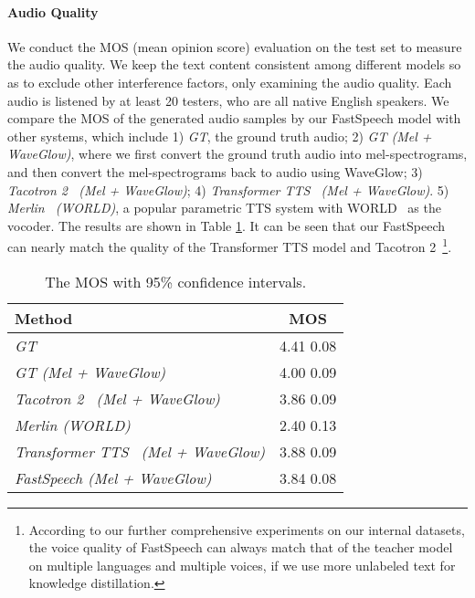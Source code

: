 \documentclass{article}
\begin{document}
\paragraph{Audio Quality}
We conduct the MOS (mean opinion score) evaluation on the test set to measure the audio quality. We keep the text content consistent among different models so as to exclude other interference factors, only examining the audio quality. Each audio is listened by at least 20 testers, who are all native English speakers. We compare the MOS of the generated audio samples by our FastSpeech model with other systems, which include 1) \textit{GT}, the ground truth audio; 2) \textit{GT (Mel + WaveGlow)}, where we first convert the ground truth audio into mel-spectrograms, and then convert the mel-spectrograms back to audio using WaveGlow; 3) \textit{Tacotron 2~\citep{shen2018natural} (Mel + WaveGlow)}; 4) \textit{Transformer TTS~\citep{li2018close} (Mel + WaveGlow)}. 5) \textit{Merlin~\citep{wu2016merlin} (WORLD)}, a popular parametric TTS system with WORLD~\citep{morise2016world} as the vocoder. The results are shown in Table \ref{tab_main_results}. It can be seen that our FastSpeech can nearly match the quality of the Transformer TTS model and Tacotron 2~\footnote{According to our further comprehensive experiments on our internal datasets, the voice quality of FastSpeech can always match that of the teacher model on multiple languages and multiple voices, if we use more unlabeled text for knowledge distillation.}.

\begin{table}[h]
	\centering
	\begin{tabular}{ l | c }
		\toprule
		Method &  MOS \\
		\midrule
		\textit{GT} & 4.41  0.08 \\
		\textit{GT (Mel + WaveGlow)} & 4.00  0.09 \\
		\textit{Tacotron 2~\citep{shen2018natural} (Mel + WaveGlow)} & 3.86   0.09  \\
		\textit{Merlin \citep{wu2016merlin} (WORLD)} & 2.40  0.13 \\
		\midrule 
		\textit{Transformer TTS~\citep{li2018close} (Mel + WaveGlow)} & 3.88  0.09 \\
		\midrule
		\textit{FastSpeech (Mel + WaveGlow)} & 3.84  0.08 \\
		\bottomrule
	\end{tabular}
	\vspace{0.3cm}
	\caption{The MOS with 95\% confidence intervals.}
	\label{tab_main_results}
	\vspace{-0.2cm}
\end{table}
\end{document}
